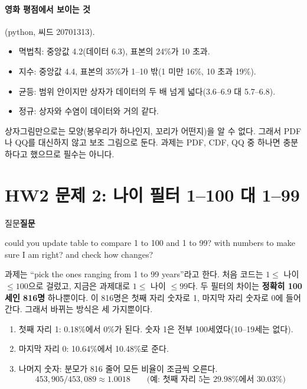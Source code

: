 \documentclass[11pt]{article}
\newenvironment{callout}[1][]
  {\par\medskip\noindent
   \begin{lrbox}{\calloutbox}\begin{minipage}{0.92\linewidth}
   \def\calloutttl{#1}\ifx\calloutttl\empty\else\textbf{#1}\par\smallskip\fi}
  {\end{minipage}\end{lrbox}%
   \fcolorbox{black!30}{black!3}{\usebox{\calloutbox}}\par\medskip}
\begin{document}
\paragraph{영화 평점에서 보이는 것} (python, 씨드 20701313).
\begin{itemize}
  \item 멱법칙: 중앙값 4.2(데이터 6.3), 표본의 24\%가 10 초과.
  \item 지수: 중앙값 4.4, 표본의 35\%가 1--10 밖(1 미만 16\%, 10 초과 19\%).
  \item 균등: 범위 안이지만 상자가 데이터의 두 배 넘게 넓다(3.6--6.9 대 5.7--6.8).
  \item 정규: 상자와 수염이 데이터와 거의 같다.
\end{itemize}
상자그림만으로는 모양(봉우리가 하나인지, 꼬리가 어떤지)을 알 수 없다. 그래서 PDF나 QQ를
대신하지 않고 보조 그림으로 둔다. 과제는 PDF, CDF, QQ 중 하나면 충분하다고 했으므로 필수는
아니다.

\section{HW2 문제 2: 나이 필터 1--100 대 1--99}
\label{sec:age-filter-compare}

\begin{callout}[질문]
could you update table to compare 1 to 100 and 1 to 99? with numbers to make sure I am right?
and check how changes?
\end{callout}

과제는 ``pick the ones ranging from 1 to 99 years''라고 한다. 처음 코드는 $1 \le$ 나이 $\le 100$으로
걸렀고, 지금은 과제대로 $1 \le$ 나이 $\le 99$다. 두 필터의 차이는 \textbf{정확히 100세인 816명}
하나뿐이다. 이 816명은 첫째 자리 숫자로 1, 마지막 자리 숫자로 0에 들어간다. 그래서 바뀌는
방식은 세 가지뿐이다.

\begin{enumerate}
  \item 첫째 자리 1: 0.18\%에서 0\%가 된다. 숫자 1은 전부 100세였다(10--19세는 없다).
  \item 마지막 자리 0: 10.64\%에서 10.48\%로 준다.
  \item 나머지 숫자: 분모가 816 줄어 모든 비율이 조금씩 오른다.
    \[
      453{,}905 / 453{,}089 \approx 1.0018 \qquad \text{(예: 첫째 자리 5는 29.98\%에서 30.03\%)}
    \]
\end{enumerate}
\end{document}
